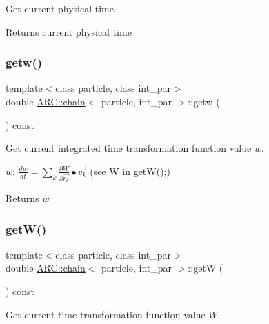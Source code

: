 Get current physical time. 

\begin{DoxyReturn}{Returns}
current physical time 
\end{DoxyReturn}
\hypertarget{classARC_1_1chain_abdd62eb43e4a7b5eca10190c90ed190f}{}\label{classARC_1_1chain_abdd62eb43e4a7b5eca10190c90ed190f} 
\subsubsection{\texorpdfstring{getw()}{getw()}}
{\footnotesize\ttfamily template$<$class particle, class int\+\_\+par$>$ \\
double \hyperlink{classARC_1_1chain}{A\+R\+C\+::chain}$<$ particle, int\+\_\+par $>$\+::getw (\begin{DoxyParamCaption}{ }\end{DoxyParamCaption}) const\hspace{0.3cm}{\ttfamily [inline]}}



Get current integrated time transformation function value $w$. 

$w$\+: $ \frac{dw}{dt} = \sum_k \frac{\partial W}{\partial \vec{r_k}} \bullet \vec{v_k} $ (see W in \hyperlink{classARC_1_1chain_abcfc20c1694a1d68a324ea9a08863af3}{get\+W()};) \begin{DoxyReturn}{Returns}
$w$ 
\end{DoxyReturn}
\hypertarget{classARC_1_1chain_abcfc20c1694a1d68a324ea9a08863af3}{}\label{classARC_1_1chain_abcfc20c1694a1d68a324ea9a08863af3} 
\subsubsection{\texorpdfstring{get\+W()}{getW()}}
{\footnotesize\ttfamily template$<$class particle, class int\+\_\+par$>$ \\
double \hyperlink{classARC_1_1chain}{A\+R\+C\+::chain}$<$ particle, int\+\_\+par $>$\+::getW (\begin{DoxyParamCaption}{ }\end{DoxyParamCaption}) const\hspace{0.3cm}{\ttfamily [inline]}}



Get current time transformation function value $W$. 

